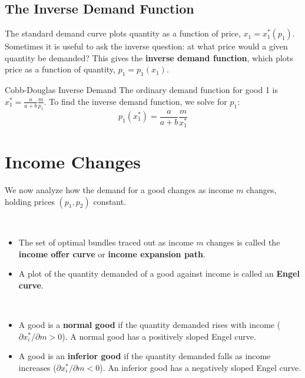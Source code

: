 \subsection{The Inverse Demand Function}
The standard demand curve plots quantity as a function of price, $x_1 = x_1^*(p_1)$. Sometimes it is useful to ask the inverse question: at what price would a given quantity be demanded? This gives the \textbf{inverse demand function}, which plots price as a function of quantity, $p_1 = p_1(x_1)$.

\begin{examplebox}{Cobb-Douglas Inverse Demand}
The ordinary demand function for good 1 is $x_1^* = \frac{a}{a+b}\frac{m}{p_1}$.
To find the inverse demand function, we solve for $p_1$:
\[ p_1(x_1^*) = \frac{a}{a+b}\frac{m}{x_1^*} \]
\end{examplebox}

\section{Income Changes}
We now analyze how the demand for a good changes as income $m$ changes, holding prices $(p_1, p_2)$ constant.

\begin{definition}
~
\begin{itemize}
    \item The set of optimal bundles traced out as income $m$ changes is called the \textbf{income offer curve} or \textbf{income expansion path}.
    \item A plot of the quantity demanded of a good against income is called an \textbf{Engel curve}.
\end{itemize}
\end{definition}

\begin{definition}
~
\begin{itemize}
    \item A good is a \textbf{normal good} if the quantity demanded rises with income ($\partial x_i^*/\partial m > 0$). A normal good has a positively sloped Engel curve.
    \item A good is an \textbf{inferior good} if the quantity demanded falls as income increases ($\partial x_i^*/\partial m < 0$). An inferior good has a negatively sloped Engel curve.
\end{itemize}
\end{definition}

